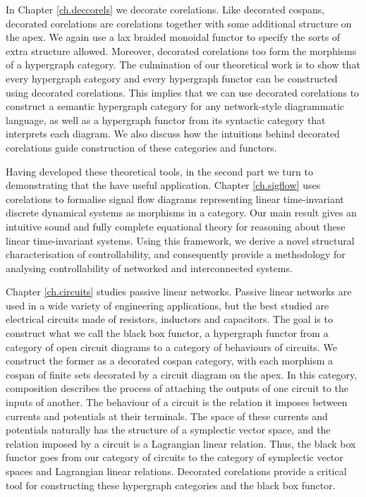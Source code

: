 In Chapter \ref{ch.deccorels} we decorate corelations. Like decorated cospans,
decorated corelations are corelations together with some additional structure on
the apex. We again use a lax braided monoidal functor to specify the sorts of
extra structure allowed. Moreover, decorated corelations too form the morphisms
of a hypergraph category. The culmination of our theoretical work is to show
that every hypergraph category and every hypergraph functor can be constructed
using decorated corelations. This implies that we can use decorated corelations
to construct a semantic hypergraph category for any network-style diagrammatic
language, as well as a hypergraph functor from its syntactic category that
interprets each diagram. We also discuss how the intuitions behind decorated
corelations guide construction of these categories and functors.

%


Having developed these theoretical tools, in the second part we turn to
demonstrating that the have useful application. Chapter \ref{ch.sigflow}
uses corelations to formalise signal flow diagrams representing linear
time-invariant discrete dynamical systems as morphisms in a category.
Our main result gives an intuitive sound and fully complete equational theory
for reasoning about these linear time-invariant systems. Using this framework,
we derive a novel structural characterisation of controllability, and
consequently provide a methodology for analysing controllability of networked
and interconnected systems.

Chapter \ref{ch.circuits} studies passive linear networks. Passive linear
networks are used in a wide variety of engineering applications, but the best
studied are electrical circuits made of resistors, inductors and capacitors. The
goal is to construct what we call the black box functor, a hypergraph functor
from a category of open circuit diagrams to a category of behaviours of
circuits. We construct the former as a decorated cospan category, with each morphism
a cospan of finite sets decorated by a circuit diagram on the apex. In this
category, composition describes the process of attaching the outputs of one
circuit to the inputs of another. The behaviour of a circuit is the relation it
imposes between currents and potentials at their terminals. The space of these
currents and potentials naturally has the structure of a symplectic vector
space, and the relation imposed by a circuit is a Lagrangian linear relation.
Thus, the black box functor goes from our category of circuits to the category
of symplectic vector spaces and Lagrangian linear relations. Decorated
corelations provide a critical tool for constructing these hypergraph categories
and the black box functor.

